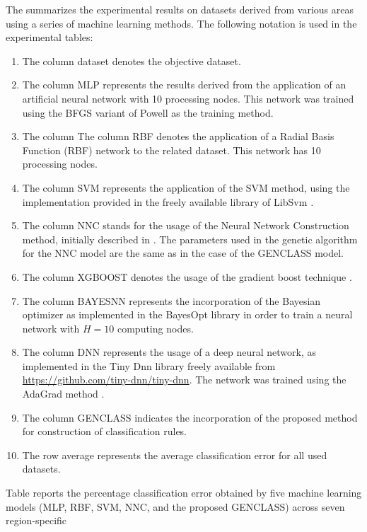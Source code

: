 \documentclass[12pt]{Definitions/academia}
\begin{document}
The  summarizes the experimental
results on datasets derived from various areas using a series of machine
learning methods. The following notation is used in the experimental
tables:
\begin{enumerate}
\item The column dataset denotes the objective dataset.
\item The column MLP represents the results derived from the application
of an artificial neural network with 10 processing nodes. This network
was trained using the BFGS variant of Powell \textit{\cite{M.J.D Powell 1989}}
as the training method.
\item The column The column RBF denotes the application of a Radial Basis
Function (RBF) network\textit{\cite{J. Park 1991,G.A. Montazer 2018}
}to the related dataset. This network has 10 processing nodes.
\item The column SVM represents the application of the SVM method, using
the implementation provided in the freely available library of LibSvm
\textit{\cite{Chang 2011}.}
\item The column NNC stands for the usage of the Neural Network Construction
method, initially described in \textit{\cite{Tsoulos 2008}}. The
parameters used in the genetic algorithm for the NNC model are the
same as in the case of the GENCLASS model.
\item The column XGBOOST denotes the usage of the gradient boost technique \textit{\cite{xgboost}}.
\item The column BAYESNN represents the incorporation of  the Bayesian optimizer as implemented in the BayesOpt  library \textit{\cite{bayesnn}} in order to  train a neural network with $H=10$ computing nodes.
\item The column DNN represents the usage of  a deep neural network, as implemented in the Tiny Dnn library freely available from  \url{https://github.com/tiny-dnn/tiny-dnn}. The network was trained using the  AdaGrad method \textit{\cite{adagrad}}.
\item The column GENCLASS indicates the incorporation of the proposed method
for construction of classification rules.
\item The row average represents the average classification error for all
used datasets.
\end{enumerate}
Table  reports the percentage
classification error obtained by five machine learning models (MLP,
RBF, SVM, NNC, and the proposed GENCLASS) across seven region-specific
\end{document}
